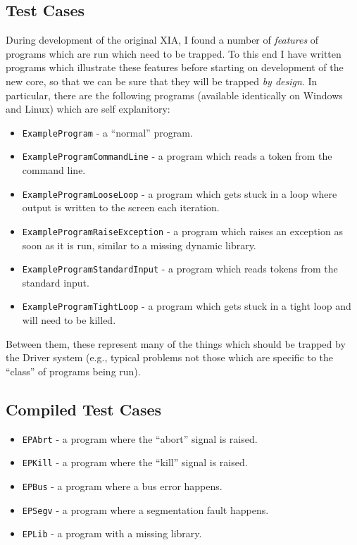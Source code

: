 \documentclass[a4paper, 11pt]{article}
\begin{document}
\subsection{Test Cases}

During development of the original XIA, I found a number of \emph{features} of
programs which are run which need to be trapped. To this end I have written
programs which illustrate these features before starting on development of the
new core, so that we can be sure that they will be trapped \emph{by design}.
In particular, there are the following programs (available identically on
Windows and Linux) which are self explanitory:

\begin{itemize}
\item{\verb|ExampleProgram| - a ``normal'' program.}
\item{\verb|ExampleProgramCommandLine| - a program which reads a token from
  the command line.}
\item{\verb|ExampleProgramLooseLoop| - a program which gets stuck in a loop
  where output is written to the screen each iteration.}
\item{\verb|ExampleProgramRaiseException| - a program which raises an
  exception as soon as it is run, similar to a missing dynamic library.}
\item{\verb|ExampleProgramStandardInput| - a program which reads tokens from
  the standard input.}
\item{\verb|ExampleProgramTightLoop| - a program which gets stuck in a tight
  loop and will need to be killed.}
\end{itemize}

Between them, these represent many of the things which should be trapped by
the Driver system (e.g., typical problems not those which are specific to the
``class'' of programs being run).

\subsection{Compiled Test Cases}

\begin{itemize}
\item{\verb|EPAbrt| - a program where the ``abort'' signal is raised.}
\item{\verb|EPKill| - a program where the ``kill'' signal is raised.}
\item{\verb|EPBus| - a program where a bus error happens.}
\item{\verb|EPSegv| - a program where a segmentation fault happens.}
\item{\verb|EPLib| - a program with a missing library.}
\end{itemize}
\end{document}
